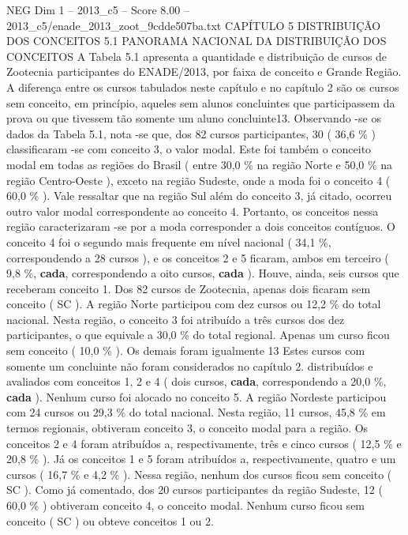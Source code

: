 \begin{textsample}{NEG Dim 1 – 2013\_c5 – Score 8.00 – 2013\_c5/enade\_2013\_zoot\_9cdde507ba.txt}  \label{ex:f1_neg_354}
CAPÍTULO 5 DISTRIBUIÇÃO DOS CONCEITOS 5.1 PANORAMA NACIONAL DA DISTRIBUIÇÃO DOS CONCEITOS A Tabela 5.1 apresenta a quantidade e distribuição de cursos de Zootecnia participantes do ENADE/2013, por faixa de conceito e Grande Região.
A diferença entre os cursos tabulados neste capítulo e no capítulo 2 são os cursos sem conceito, em princípio, aqueles sem alunos concluintes que participassem da prova ou que tivessem tão somente um aluno concluinte13.
Observando -se os dados da Tabela 5.1, nota -se que, dos 82 cursos participantes, 30 ( 36,6 \% ) classificaram -se com conceito 3, o valor modal.
Este foi também o conceito modal em todas as regiões do Brasil ( entre 30,0 \% na região Norte e 50,0 \% na região Centro-Oeste ), exceto na região Sudeste, onde a moda foi o conceito 4 ( 60,0 \% ).
Vale ressaltar que na região Sul além do conceito 3, já citado, ocorreu outro valor modal correspondente ao conceito 4.
Portanto, os conceitos nessa região caracterizaram -se por a moda corresponder a dois conceitos contíguos.
O conceito 4 foi o segundo mais frequente em nível nacional ( 34,1 \%, correspondendo a 28 cursos ), e os conceitos 2 e 5 ficaram, ambos em terceiro ( 9,8 \%, \textbf{cada}, correspondendo a oito cursos, \textbf{cada} ).
Houve, ainda, seis cursos que receberam conceito 1.
Dos 82 cursos de Zootecnia, apenas dois ficaram sem conceito ( SC ).
A região Norte participou com dez cursos ou 12,2 \% do total nacional.
Nesta região, o conceito 3 foi atribuído a três cursos dos dez participantes, o que equivale a 30,0 \% do total regional.
Apenas um curso ficou sem conceito ( 10,0 \% ).
Os demais foram igualmente 13 Estes cursos com somente um concluinte não foram considerados no capítulo 2. distribuídos e avaliados com conceitos 1, 2 e 4 ( dois cursos, \textbf{cada}, correspondendo a 20,0 \%, \textbf{cada} ).
Nenhum curso foi alocado no conceito 5.
A região Nordeste participou com 24 cursos ou 29,3 \% do total nacional.
Nesta região, 11 cursos, 45,8 \% em termos regionais, obtiveram conceito 3, o conceito modal para a região.
Os conceitos 2 e 4 foram atribuídos a, respectivamente, três e cinco cursos ( 12,5 \% e 20,8 \% ).
Já os conceitos 1 e 5 foram atribuídos a, respectivamente, quatro e um cursos ( 16,7 \% e 4,2 \% ).
Nessa região, nenhum dos cursos ficou sem conceito ( SC ).
Como já comentado, dos 20 cursos participantes da região Sudeste, 12 ( 60,0 \% ) obtiveram conceito 4, o conceito modal.
Nenhum curso ficou sem conceito ( SC ) ou obteve conceitos 1 ou 2.

\end{textsample}
